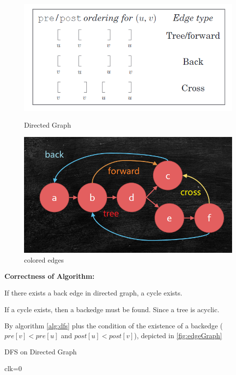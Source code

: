 \begin{figure}[htbp]
	\centering
	\begin{minipage}{0.5\linewidth}
		\centering
		\includegraphics[width=0.8\linewidth]{Notes/fig/edgeType.png}
		\caption{Directed Graph}
        \label{fig:edgeGraph}
    	\end{minipage}
	\begin{minipage}{0.4\linewidth}
		\centering
		\includegraphics[width=0.8\linewidth]{Notes/fig/edgeTypeFigure.png}
		\caption{colored edges}
		\label{fig:colored}%
	\end{minipage}
\end{figure}
\textbf{Correctness of Algorithm:}

If there exists a back edge in directed graph, a cycle exists.

If a cycle exists, then a backedge must be found. Since a tree is acyclic.

By algorithm \ref{alg:dfs} plus the condition of the existence of a backedge ($pre[v]<pre[u]$ and $post[u]<post[v]$), depicted in \ref{fig:edgeGraph}
\begin{algorithm}
    \caption{DFS on Directed Graph}
    \label{alg:dfs}
    clk=0\\
\end{algorithm}



